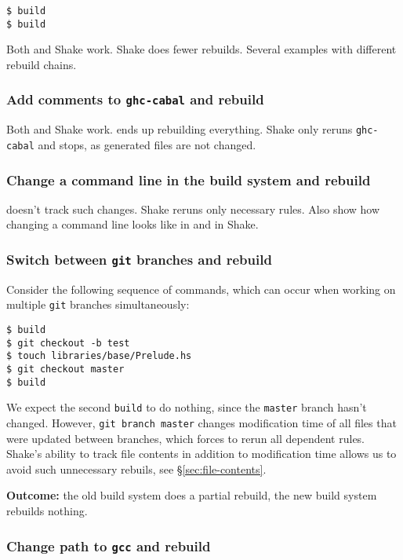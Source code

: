 \begin{lstlisting}
$ build
$ build
\end{lstlisting}

Both \make{} and Shake work. Shake does fewer rebuilds. Several examples with
different rebuild chains.

\subsubsection{Add comments to \texttt{ghc-cabal} and rebuild}

Both \make{} and Shake work. \make{} ends up rebuilding everything. Shake only
reruns \texttt{ghc-cabal} and stops, as generated files are not changed.

\subsubsection{Change a command line in the build system and rebuild}

\make{} doesn't track such changes. Shake reruns only necessary rules.
Also show how changing a command line looks like in \make{} and in Shake.

\subsubsection{Switch between \texttt{git} branches and rebuild}

Consider the following sequence of commands, which can occur when working on
multiple \texttt{git} branches simultaneously:

\begin{lstlisting}
$ build
$ git checkout -b test
$ touch libraries/base/Prelude.hs
$ git checkout master
$ build
\end{lstlisting}

We expect the second \texttt{build} to do nothing, since the \texttt{master}
branch hasn't changed. However, \texttt{git branch master} changes modification
time of all files that were updated between branches, which forces \make{} to
rerun all dependent rules. Shake's ability to track file contents in addition to
modification time allows us to avoid such unnecessary rebuils, see
\S\ref{sec:file-contents}.

\textbf{Outcome:} the old build system does a partial rebuild, the new build
system rebuilds nothing.

\subsubsection{Change path to \texttt{gcc} and rebuild}

